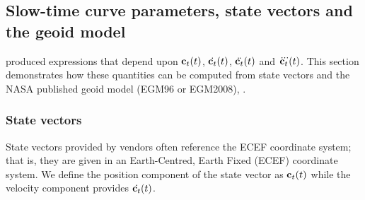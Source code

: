 \subsection{Slow-time curve parameters, state vectors and the geoid model}
\label{sc:svgeoid}
 produced expressions that depend upon $\mathbf{c}_t(t)$, $\dot{\mathbf{c}_t}(t)$, $\ddot{\mathbf{c}_t}(t)$ and $\dddot{\mathbf{c}_t}(t)$. This section demonstrates how these quantities can be computed from state vectors and the NASA published geoid model (EGM96 or EGM2008), \cite{NASAEGM86}.
\subsubsection{State vectors}
State vectors provided by vendors often reference the ECEF coordinate system; that is, they are given in an Earth-Centred, Earth Fixed (ECEF) coordinate system. We define the position component of the state vector as $\mathbf{c}_t(t)$ while the velocity component provides $\dot{\mathbf{c}_t}(t)$.
